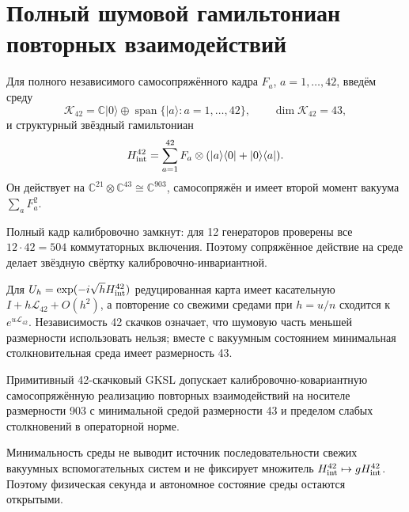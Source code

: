 \chapter{Полный шумовой гамильтониан повторных взаимодействий}
\label{ch:v8-full-noise-repeated-interaction-hamiltonian-gate}

Для полного независимого самосопряжённого кадра $F_a$, $a=1,\ldots,42$,
введём среду
\begin{equation}
 \mathcal K_{42}=\mathbb C|0\rangle\oplus
 \operatorname{span}\{|a\rangle:a=1,\ldots,42\},
 \qquad \dim\mathcal K_{42}=43,
\end{equation}
и структурный звёздный гамильтониан
\begin{equation}
 H_{\rm int}^{42}=\sum_{a=1}^{42}F_a\otimes
 (|a\rangle\langle0|+|0\rangle\langle a|).
\end{equation}
Он действует на $\mathbb C^{21}\otimes\mathbb C^{43}\cong\mathbb C^{903}$,
самосопряжён и имеет второй момент вакуума $\sum_aF_a^2$.

Полный кадр калибровочно замкнут: для 12 генераторов проверены все
$12\cdot42=504$ коммутаторных включения. Поэтому сопряжённое действие на
среде делает звёздную свёртку калибровочно-инвариантной.

Для $U_h=\exp(-i\sqrt h H_{\rm int}^{42})$ редуцированная карта имеет
касательную $I+h\mathcal L_{42}+O(h^2)$, а повторение со свежими средами при
$h=u/n$ сходится к $e^{u\mathcal L_{42}}$. Независимость 42 скачков означает,
что шумовую часть меньшей размерности использовать нельзя; вместе с вакуумным
состоянием минимальная столкновительная среда имеет размерность 43.

\begin{theorem}
Примитивный 42-скачковый GKSL допускает калибровочно-ковариантную самосопряжённую
реализацию повторных взаимодействий на носителе размерности 903 с минимальной
средой размерности 43 и пределом слабых столкновений в операторной норме.
\end{theorem}

\begin{nogocriterion}
Минимальность среды не выводит источник последовательности свежих вакуумных
вспомогательных систем и не фиксирует множитель $H_{\rm int}^{42}\mapsto gH_{\rm int}^{42}$.
Поэтому физическая секунда и автономное состояние среды остаются открытыми.
\end{nogocriterion}

